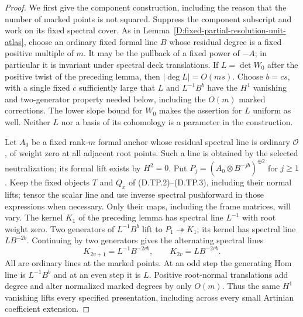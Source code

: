 \begin{proof}
We first give the component construction, including
the reason that the number of marked points is not
squared. Suppress the component subscript and work
on its fixed spectral cover. As in
Lemma~\ref{D:fixed-partial-resolution-unit-atlas},
choose an ordinary fixed formal line $B$ whose
residual degree is a fixed positive multiple of $m$.
It may be the pullback of a fixed power of $-A$;
in particular it is invariant under spectral deck
translations. If $L=\det W_0$ after the positive
twist of the preceding lemma, then $|\deg L|=O(ms)$.
Choose $b=cs$, with a single fixed $c$ sufficiently
large that $L$ and $L^{-1}B^b$ have the $H^1$
vanishing and two-generator property needed below,
including the $O(m)$ marked corrections. The lower
slope bound for $W_0$ makes the assertion for $L$
uniform as well. Neither $L$ nor a basis of its
cohomology is a parameter in the construction.

Let $A_0$ be a fixed rank-$m$ formal anchor whose
residual spectral line is ordinary $\mathcal O$,
of weight zero at all adjacent root points. Such
a line is obtained by the selected neutralization;
its formal lift exists by $H^2=0$. Put
$P_j=(A_0\otimes B^{-jb})^{\oplus2}$ for $j\geq1$.
Keep the fixed objects $T$ and $Q_x$ of
(D.TP.2)--(D.TP.3), including their normal lifts;
tensor the scalar line and use inverse spectral
pushforward in those expressions when necessary.
Only their maps, including the frame matrices,
will vary. The kernel $K_1$ of the preceding
lemma has spectral line $L^{-1}$ with root weight
zero. Two generators of $L^{-1}B^b$ lift to
$P_1\twoheadrightarrow K_1$; its kernel has
spectral line $LB^{-2b}$. Continuing by two
generators gives the alternating spectral lines
\[
 K_{2v+1}=L^{-1}B^{-2vb},\qquad
 K_{2v}=LB^{-2vb}.                                  \tag{D.TP.5a}
\]
All are ordinary lines at the marked points.
At an odd step the generating Hom line is
$L^{-1}B^b$ and at an even step it is $L$.
Positive root-normal translations add degree
and alter normalized marked degrees by only
$O(m)$. Thus the same $H^1$ vanishing lifts
every specified presentation, including across
every small Artinian coefficient extension.


\end{proof}
